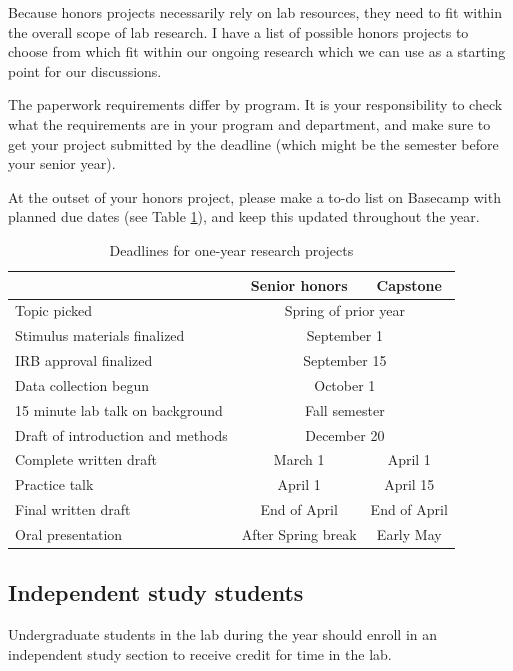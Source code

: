 \documentclass[letterpaper,12pt,oneside]{memoir}
\begin{document}
Because honors projects necessarily rely on lab resources, they need to fit within the overall scope of lab research. I have a list of possible honors projects to choose from which fit within our ongoing research which we can use as a starting point for our discussions.

The paperwork requirements differ by program. It is your responsibility to check what the requirements are in your program and department, and make sure to get your project submitted by the deadline (which might be the semester before your senior year).

At the outset of your honors project, please make a to-do list on Basecamp with planned due dates (see Table \ref{table:deadlines}), and keep this updated throughout the year.

\begin{table}
\centering
\caption{Deadlines for one-year research projects}
\begin{tabular}{lcc}
\toprule
& Senior honors & Capstone\\
\midrule
Topic picked& \multicolumn{2}{c}{Spring of prior year}\\
Stimulus materials finalized& \multicolumn{2}{c}{September 1}\\
IRB approval finalized& \multicolumn{2}{c}{September 15}\\
Data collection begun& \multicolumn{2}{c}{October 1}\\
15 minute lab talk on background& \multicolumn{2}{c}{Fall semester}\\
Draft of introduction and methods& \multicolumn{2}{c}{December 20}\\
Complete written draft& March 1& April 1\\
Practice talk& April 1 & April 15\\
Final written draft& End of April & End of April\\
Oral presentation& After Spring break & Early May\\
\bottomrule
\end{tabular}
\label{table:deadlines}
\end{table}

\subsection{Independent study students}
Undergraduate students in the lab during the year should enroll in an independent study section to receive credit for time in the lab.
\end{document}
